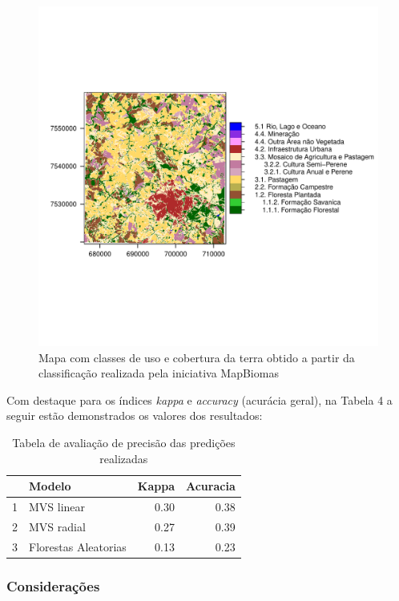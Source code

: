 \begin{figure}[H]
    \centering
    \caption{Mapa com classes de uso e cobertura da terra obtido a partir da classificação realizada pela iniciativa MapBiomas} 
    \includegraphics[scale=0.8]{figs/map_mapbiomas.pdf}
\end{figure}

Com destaque para os índices \emph{kappa} e \emph{accuracy} (acurácia geral), na Tabela 4 a seguir estão demonstrados os valores dos resultados:

\begin{table}[H]
\caption{Tabela de avaliação de precisão das predições realizadas}
\centering
\begin{tabular}{rlrr}
  \hline
 & Modelo & Kappa & Acuracia \\ 
  \hline
1 & MVS linear & 0.30 & 0.38 \\ 
  2 & MVS radial & 0.27 & 0.39 \\ 
  3 & Florestas Aleatorias & 0.13 & 0.23 \\ 
   \hline
\end{tabular}
\end{table}

\subsubsection{Considerações}\label{considerauxe7uxf5es}

